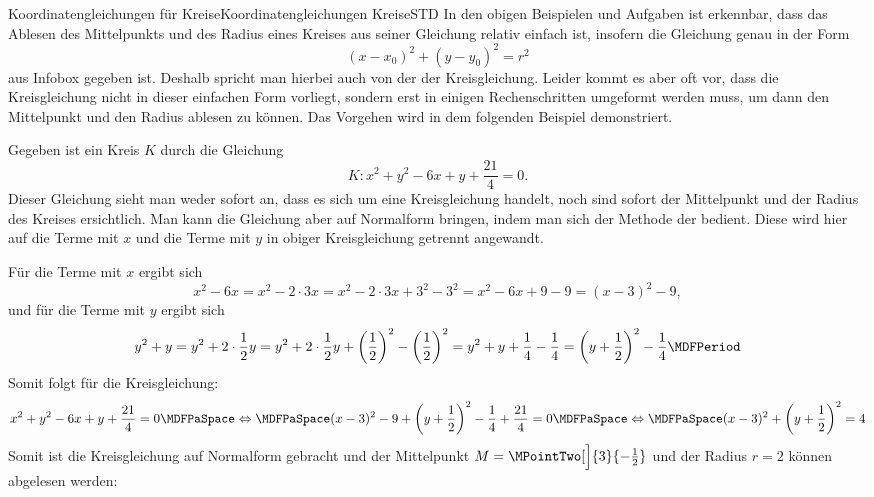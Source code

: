 \begin{MXContent}{Koordinatengleichungen für Kreise}{Koordinatengleichungen Kreise}{STD}
In den obigen Beispielen und Aufgaben ist erkennbar, dass das Ablesen des Mittelpunkts und des Radius eines Kreises aus seiner Gleichung relativ einfach ist, insofern die Gleichung genau in der Form 
\[
 (x-x_0)^2+(y-y_0)^2=r^2
\]
aus Infobox  gegeben ist. Deshalb spricht man hierbei auch von der  der Kreisgleichung. Leider kommt es aber oft vor, dass die Kreisgleichung nicht in dieser einfachen Form vorliegt, sondern erst in einigen Rechenschritten umgeformt werden muss, um dann den Mittelpunkt und  den Radius ablesen zu können. Das Vorgehen wird in dem folgenden Beispiel demonstriert. 

\begin{MExample}
Gegeben ist ein Kreis $K$ durch die Gleichung
\[
 K\colon x^2+y^2-6x+y+\frac{21}{4}=0.
\]
Dieser Gleichung sieht man weder sofort an, dass es sich um eine Kreisgleichung handelt, noch sind sofort der Mittelpunkt und der Radius des Kreises ersichtlich. Man kann die Gleichung aber auf Normalform bringen, indem man sich der Methode der  bedient. Diese wird hier auf die Terme mit $x$ und die Terme mit $y$ in obiger Kreisgleichung getrennt angewandt.

Für die Terme mit $x$ ergibt sich
\[
 x^2-6x = x^2 -2\cdot3x = x^2 -2\cdot3x +3^2-3^2 = x^2-6x+9-9 = (x-3)^2-9,
\]
und für die Terme mit $y$ ergibt sich
\[
 y^2+y = y^2+2\cdot\frac{1}{2}y =  y^2+2\cdot\frac{1}{2}y + \left(\frac{1}{2}\right)^2 - \left(\frac{1}{2}\right)^2 = y^2+y+\frac{1}{4}-\frac{1}{4}=\left(y+\frac{1}{2}\right)^2-\frac{1}{4}\MDFPeriod 
\]
Somit folgt für die Kreisgleichung:
\[
 x^2+y^2-6x+y+\frac{21}{4}=0\MDFPaSpace\Leftrightarrow\MDFPaSpace (x-3)^2-9 + \left(y+\frac{1}{2}\right)^2-\frac{1}{4}+\frac{21}{4}=0\MDFPaSpace\Leftrightarrow\MDFPaSpace (x-3)^2+ \left(y+\frac{1}{2}\right)^2=4
\]
Somit ist die Kreisgleichung auf Normalform gebracht und der Mittelpunkt $M=\MPointTwo[\Big]{3}{-\frac{1}{2}}$ und der Radius $r=2$ können abgelesen werden:
\begin{center}
\end{center}
\end{MExample}
\end{MXContent}
